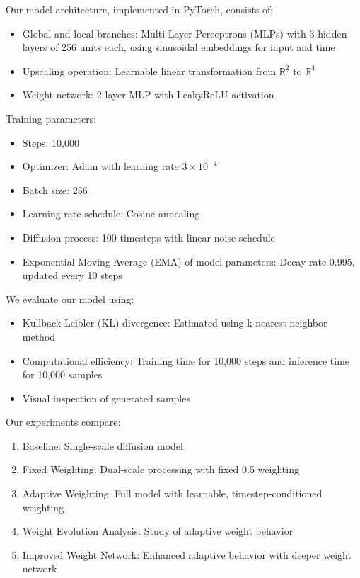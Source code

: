 \documentclass{article} %
\begin{document}
Our model architecture, implemented in PyTorch, consists of:

\begin{itemize}
    \item Global and local branches: Multi-Layer Perceptrons (MLPs) with 3 hidden layers of 256 units each, using sinusoidal embeddings for input and time
    \item Upscaling operation: Learnable linear transformation from $\mathbb{R}^2$ to $\mathbb{R}^4$
    \item Weight network: 2-layer MLP with LeakyReLU activation
\end{itemize}

Training parameters:
\begin{itemize}
    \item Steps: 10,000
    \item Optimizer: Adam with learning rate $3 \times 10^{-4}$
    \item Batch size: 256
    \item Learning rate schedule: Cosine annealing
    \item Diffusion process: 100 timesteps with linear noise schedule
    \item Exponential Moving Average (EMA) of model parameters: Decay rate 0.995, updated every 10 steps
\end{itemize}

We evaluate our model using:
\begin{itemize}
    \item Kullback-Leibler (KL) divergence: Estimated using k-nearest neighbor method
    \item Computational efficiency: Training time for 10,000 steps and inference time for 10,000 samples
    \item Visual inspection of generated samples
\end{itemize}

Our experiments compare:
\begin{enumerate}
    \item Baseline: Single-scale diffusion model
    \item Fixed Weighting: Dual-scale processing with fixed 0.5 weighting
    \item Adaptive Weighting: Full model with learnable, timestep-conditioned weighting
    \item Weight Evolution Analysis: Study of adaptive weight behavior
    \item Improved Weight Network: Enhanced adaptive behavior with deeper weight network
\end{enumerate}
\end{document}
